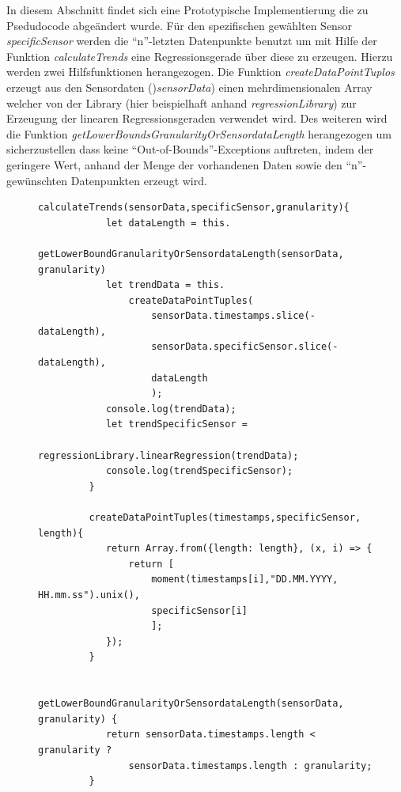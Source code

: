 \pagebreak

\label{prognose}

In diesem Abschnitt findet sich eine Prototypische Implementierung die zu Psedudocode abgeändert wurde.
Für den spezifischen gewählten Sensor \textit{specificSensor} werden die \enquote{n}-letzten Datenpunkte benutzt um mit Hilfe der Funktion \textit{calculateTrends} eine Regressionsgerade über diese zu erzeugen. Hierzu werden zwei Hilfsfunktionen herangezogen. Die Funktion \textit{createDataPointTuplos} erzeugt aus den Sensordaten ()\textit{sensorData}) einen mehrdimensionalen Array welcher von der Library (hier beispielhaft anhand \textit{regressionLibrary}) zur Erzeugung der linearen Regressionsgeraden verwendet wird.
Des weiteren wird die Funktion \textit{getLowerBoundsGranularityOrSensordataLength} herangezogen um sicherzustellen dass keine \enquote{Out-of-Bounds}-Exceptions auftreten, indem der geringere Wert, anhand der Menge der vorhandenen Daten sowie den \enquote{n}-gewünschten Datenpunkten erzeugt wird.

\begin{figure}[bht]
    \begin{lstlisting}[caption=Pseudocode Regressionsgerade, label=list:regression]
		   calculateTrends(sensorData,specificSensor,granularity){
		 	let dataLength = this.
		 		getLowerBoundGranularityOrSensordataLength(sensorData, granularity)
		 	let trendData = this.
		 		createDataPointTuples(
		 			sensorData.timestamps.slice(-dataLength),
		 			sensorData.specificSensor.slice(-dataLength),
		 			dataLength
		 			);
		 	console.log(trendData);
		 	let trendSpecificSensor =
		 		regressionLibrary.linearRegression(trendData);
		 	console.log(trendSpecificSensor);
		 }

		 createDataPointTuples(timestamps,specificSensor, length){
		 	return Array.from({length: length}, (x, i) => {
		 		return [
		 			moment(timestamps[i],"DD.MM.YYYY, HH.mm.ss").unix(),
		 			specificSensor[i]
		 			];
		 	});
		 }

		 getLowerBoundGranularityOrSensordataLength(sensorData, granularity) {
		 	return sensorData.timestamps.length < granularity ?
		 		sensorData.timestamps.length : granularity;
		 }
    \end{lstlisting}
\end{figure}

\pagebreak


